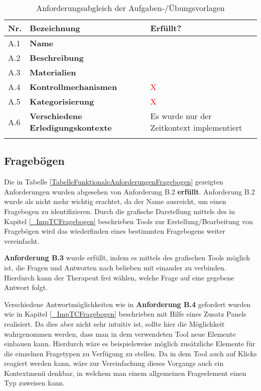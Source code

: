 \begin{table}[htbp]
	\begin{center}
		\begin{tabular}{p{} p{} p{}}
			\rowcolor{black!20} \textbf{Nr.} & \textbf{Bezeichnung} & \textbf{Erfüllt?} \\ \toprule 
			A.1 & \textbf{Name} & \textcolor{green}{\checkmark} \\ \hline \addlinespace
			A.2 & \textbf{Beschreibung} & \textcolor{green}{\checkmark} \\ \hline \addlinespace
			A.3 & \textbf{Materialien} & \textcolor{green}{\checkmark} \\ \hline \addlinespace
			A.4 & \textbf{Kontrollmechanismen} & \textcolor{red}{X} \\ \hline \addlinespace
			A.5 & \textbf{Kategorisierung} & \textcolor{red}{X}  \\ \hline \addlinespace
			A.6 & \textbf{Verschiedene Erledigungskontexte} & Es wurde nur der Zeitkontext implementiert \\ \hline \addlinespace
		\end{tabular}
	\end{center}
	\caption[Anforderungsabgleich der Aufgaben-/Übungsvorlagen]{Anforderungsabgleich der Aufgaben-/Übungsvorlagen}
	\label{TabelleAnforderungsabgleichVorlagen}
\end{table}

\subsection{Fragebögen}
Die in Tabelle \ref{TabelleFunktionaleAnforderungenFragebogen} gezeigten Anforderungen wurden abgesehen von Anforderung B.2 \textbf{erfüllt}. Anforderung B.2 wurde als nicht mehr wichtig erachtet, da der Name ausreicht, um einen Fragebogen zu identifizieren. Durch die grafische Darstellung mittels des in Kapitel \ref{_ImpTCFragebogen} beschrieben Tools zur Erstellung/Bearbeitung von Fragebögen wird das wiederfinden eines bestimmten Fragebogens weiter vereinfacht.

\textbf{Anforderung B.3} wurde erfüllt, indem es mittels des grafischen Tools möglich ist, die Fragen und Antworten nach belieben mit einander zu verbinden. Hierdurch kann der Therapeut frei wählen, welche Frage auf eine gegebene Antwort folgt.

Verschiedene Antwortmöglichkeiten wie in \textbf{Anforderung B.4} gefordert wurden wie in Kapitel \ref{_ImpTCFragebogen} beschrieben mit Hilfe eines Zusatz Panels realisiert. Da dies aber nicht sehr intuitiv ist, sollte hier die Möglichkeit wahrgenommen werden, dass man in dem verwendeten Tool neue Elemente einbauen kann. Hierdurch wäre es beispielsweise möglich zusätzliche Elemente für die einzelnen Fragetypen zu Verfügung zu stellen. Da in dem Tool auch auf Klicks reagiert werden kann, wäre zur Vereinfachung dieses Vorgangs auch ein Kontextmenü denkbar, in welchem man einem allgemeinen Frageelement einen Typ zuweisen kann.

